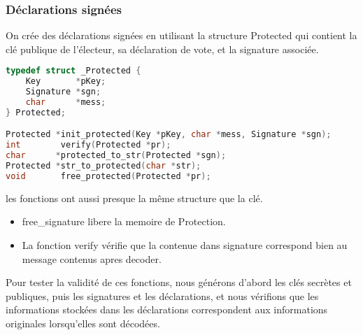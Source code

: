 \documentclass{article}
\begin{document}
\subsubsection{Déclarations signées}
\newline On crée des déclarations signées en utilisant la structure Protected qui contient la clé publique de l'électeur, sa déclaration de vote, et la signature associée.
\begin{lstlisting}[language={C}]
typedef struct _Protected {
    Key       *pKey;
    Signature *sgn;
    char      *mess;
} Protected;

Protected *init_protected(Key *pKey, char *mess, Signature *sgn);
int        verify(Protected *pr);
char      *protected_to_str(Protected *sgn);
Protected *str_to_protected(char *str);
void       free_protected(Protected *pr);
\end{lstlisting}
les fonctions ont aussi presque la même structure que la clé.
\begin{itemize}
    \item free\_signature libere la memoire de Protection.
    \item La fonction verify vérifie que la contenue dans signature correspond bien au message contenus apres decoder.
\end{itemize}
Pour tester la validité de ces fonctions, nous générons d'abord les clés secrètes et publiques, puis les signatures et les déclarations, et nous vérifions que les informations stockées dans les déclarations correspondent aux informations originales lorsqu'elles sont décodées.
\end{document}

